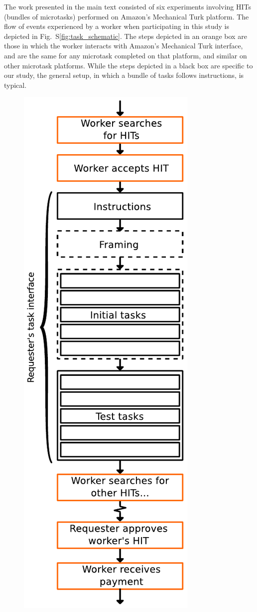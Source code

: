 \documentclass[12pt]{article}
\begin{document}
The work presented in the main text consisted of six experiments involving
HITs (bundles of microtasks) performed on Amazon's Mechanical Turk platform.  
The flow of events experienced by a worker when participating in this study 
is depicted in Fig.~S\ref{fig:task_schematic}.  
The steps depicted in an orange box are those
in which the worker interacts with Amazon's Mechanical Turk interface, and 
are the same for any microtask completed on that platform, and similar
on other microtask platforms.  While the steps depicted in a black box 
are specific to our study, the general setup, in which a bundle of tasks
follows instructions, is typical.
\begin{figure}
	\begin{center}
	\includegraphics[scale=0.8]{figs/task_schematic.pdf}

\end{center}
\end{figure}
\end{document}

